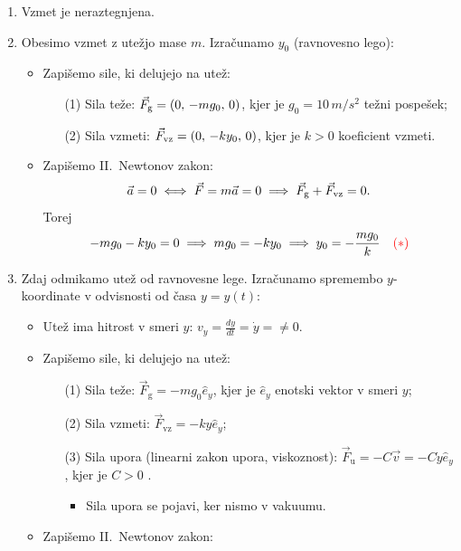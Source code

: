 \begin{enumerate}
    \item Vzmet je neraztegnjena.
    \item Obesimo vzmet z utežjo mase \(m\). Izračunamo \(y_0\) (ravnovesno lego):
    \begin{itemize}
        \item Zapišemo sile, ki delujejo na utež:
        \begin{enumerate}
            \item[(1)] Sila teže: \(\vec{F}_\text{g} = (0, \, -mg_0, \, 0)\), kjer je \(g_0 = 10 \, m / s^2\) težni pospešek;
            \item[(2)] Sila vzmeti: \(\vec{F}_\text{vz} = (0, \, -ky_0, \, 0)\), kjer je \(k > 0\) koeficient vzmeti.
        \end{enumerate}
        \item Zapišemo II.\ Newtonov zakon:
        \[
        \vec{a} = 0 \iff \vec{F} = m \vec{a} = 0 \implies \vec{F}_\text{g} + \vec{F}_\text{vz} = 0.
        \]
        Torej
        \[
        -mg_0 - ky_0 = 0 \implies mg_0 = -ky_0 \implies y_0 = -\frac{mg_0}{k} \quad \textcolor{red}{(*)}
        \]        
    \end{itemize}
    \item Zdaj odmikamo utež od ravnovesne lege. Izračunamo spremembo \(y\)-koordinate v odvisnosti od časa \(y = y(t)\):
    \begin{itemize}
        \item Utež ima hitrost v smeri \(y\): \( v_y = \frac{dy}{dt} = \dot{y} = \neq 0\).
        \item Zapišemo sile, ki delujejo na utež:
        \begin{itemize}
            \item[(1)] Sila teže: \(\vec{F}_\text{g} = -mg_0 \widehat{e}_y\), kjer je \(\widehat{e}_y\) enotski vektor v smeri \(y\); 
            \item[(2)] Sila vzmeti: \(\vec{F}_\text{vz} = -ky\widehat{e}_y\);
            \item[(3)] Sila upora (linearni zakon upora, viskoznost): \(\vec{F}_\text{u} = -C \vec{v} = -C \dot{y} \widehat{e}_y\), kjer je \(C > 0\) .
            \begin{itemize}
                \item Sila upora se pojavi, ker nismo v vakuumu.
            \end{itemize}            
        \end{itemize}
        \item Zapišemo II.\ Newtonov zakon:

\end{itemize}
\end{enumerate}
